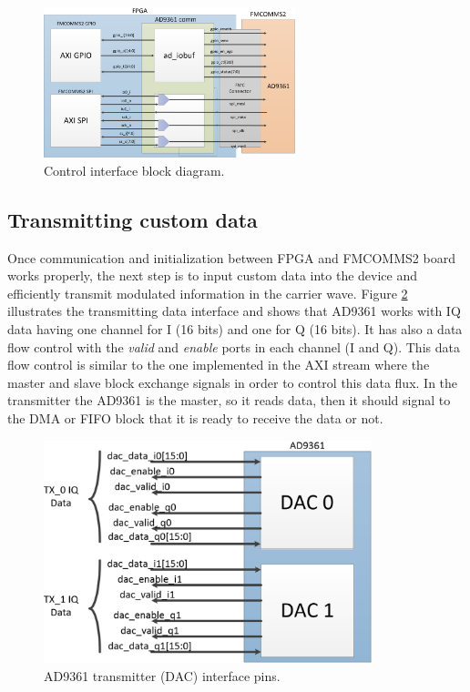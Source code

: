 \begin{figure}[htbp]
    \centering
    \includegraphics[width=0.65\textwidth]{./figures/comm_if}
    \caption{ Control interface block diagram.
    \label{fig:commif}}
\end{figure}

\subsection{Transmitting custom data}

Once communication and initialization between FPGA and FMCOMMS2 board works
properly, the next step is to input custom data into the device and efficiently
transmit modulated information in the carrier wave. Figure \ref{fig:txpins}
illustrates the transmitting data interface and shows that AD9361 works with IQ
data having one channel for I (16 bits) and one for Q (16 bits). It has also a
data flow control with the \emph{valid} and \emph{enable} ports in each channel
(I and Q). This data flow control is similar to the one implemented in the AXI
stream \cite{xilinx:axi} where the master and slave block exchange signals in
order to control this data flux. In the transmitter the AD9361 is the master, so
it reads data, then it should signal to the DMA or FIFO block that it is ready
to receive the data or not.

\begin{figure}[htbp]
    \centering
    \includegraphics[width=0.85\textwidth]{./figures/ad9361tx_pins}
    \caption{ AD9361 transmitter (DAC) interface pins.
    \label{fig:txpins}}
\end{figure}

